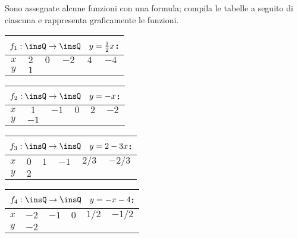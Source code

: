 \begin{esercizio}
\label{ese:8.39}
Sono assegnate alcune funzioni con una formula; compila le tabelle a seguito di ciascuna e rappresenta graficamente le funzioni.
\begin{multicols}{2}
 \begin{center}
 \begin{tabular}{cccccc}
 \multicolumn{6}{c}{$f_1:\insQ \rightarrow \insQ\quad y=\frac{1}{2}x$:}\\
 \toprule
  $x$ & $ 2 $&$ 0 $ &$ -2 $ &$ 4 $ &$ -4 $\\
  $y$ & $1$& & & & \\
\bottomrule
 \end{tabular}
 \end{center}

\begin{center}
 \begin{tabular}{cccccc}
 \multicolumn{6}{c}{ $f_2:\insQ \rightarrow \insQ\quad y=-x$:}\\
\toprule
$x$ & $1$&$ -1 $ &$ 0 $ &$ 2 $ &$ -2 $\\
$y$ & $-1$& & & & \\
\bottomrule
 \end{tabular}
\end{center}

 \begin{center}
 \begin{tabular}{cccccc}
 \multicolumn{6}{c}{ $f_3:\insQ \rightarrow \insQ\quad y=2-3x$:}\\
\toprule
$x$ & $0$&$ 1 $ &$ -1 $ &$ 2/3 $ &$ -2/3 $\\
$y$ & $2$& & & & \\
\bottomrule
 \end{tabular}
 \end{center}

 \begin{center}
 \begin{tabular}{cccccc}
 \multicolumn{6}{c}{ $f_4:\insQ \rightarrow \insQ\quad y=-x-4$:}\\
\toprule
$x$ & $-2$&$ -1 $ &$ 0 $ &$ 1/2 $ &$ -1/2 $\\
$y$ & $-2$& & & & \\
\bottomrule
 \end{tabular}
 \end{center}
\end{multicols}
\end{esercizio}

